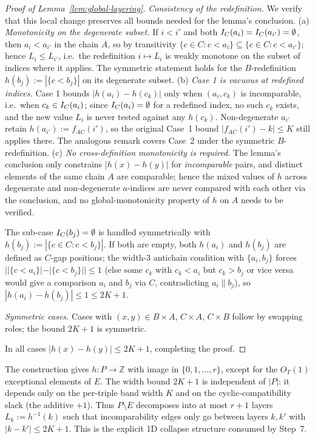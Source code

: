 \begin{proof}[Proof of Lemma~\ref{lem:global-layering}]
\emph{Consistency of the redefinition.} We verify that this local change preserves
all bounds needed for the lemma's conclusion.
(a) \emph{Monotonicity on the degenerate subset.} If $i < i'$ and both
$I_C(a_i) = I_C(a_{i'}) = \emptyset$, then $a_i < a_{i'}$ in the chain $A$, so
by transitivity $\{c \in C : c < a_i\} \subseteq \{c \in C : c < a_{i'}\}$;
hence $L_i \le L_{i'}$, i.e.\ the redefinition $i \mapsto L_i$ is weakly monotone
on the subset of indices where it applies. The symmetric statement holds for
the $B$-redefinition $h(b_j) := |\{c < b_j\}|$ on its degenerate subset.
(b) \emph{Case 1 is vacuous at redefined indices.} Case 1 bounds
$|h(a_i) - h(c_k)|$ only when $(a_i, c_k)$ is incomparable, i.e.\ when
$c_k \in I_C(a_i)$; since $I_C(a_i) = \emptyset$ for a redefined index, no
such $c_k$ exists, and the new value $L_i$ is never tested against any
$h(c_k)$. Non-degenerate $a_{i'}$ retain $h(a_{i'}) := f_{AC}(i')$, so the
original Case~1 bound $|f_{AC}(i') - k| \le K$ still applies there. The
analogous remark covers Case~2 under the symmetric $B$-redefinition.
(c) \emph{No cross-definition monotonicity is required.} The lemma's
conclusion only constrains $|h(x) - h(y)|$ for \emph{incomparable} pairs, and
distinct elements of the same chain $A$ are comparable; hence the mixed values
of $h$ across degenerate and non-degenerate $a$-indices are never compared
with each other via the conclusion, and no global-monotonicity property of
$h$ on $A$ needs to be verified.

The sub-case $I_C(b_j) = \emptyset$ is handled symmetrically with
$h(b_j) := |\{c \in C : c < b_j\}|$. If both are empty, both $h(a_i)$ and
$h(b_j)$ are defined as $C$-gap positions; the width-$3$ antichain condition
with $\{a_i, b_j\}$ forces $| |\{c < a_i\}| - |\{c < b_j\}| | \le 1$ (else
some $c_k$ with $c_{k} < a_i$ but $c_k > b_j$ or vice versa would give a
comparison $a_i$ and $b_j$ via $C$, contradicting $a_i \parallel b_j$), so
$|h(a_i) - h(b_j)| \le 1 \le 2K + 1$.

\smallskip
\noindent\emph{Symmetric cases.} Cases with $(x,y) \in B \times A$,
$C \times A$, $C \times B$ follow by swapping roles; the bound $2K+1$ is
symmetric.

\smallskip
In all cases $|h(x) - h(y)| \le 2K + 1$, completing the proof.
\end{proof}

\begin{remark}
The construction gives $h : P \to \mathbb{Z}$ with image in $\{0, 1, \ldots, r\}$,
except for the $O_T(1)$ exceptional elements of $E$. The width bound
$2K + 1$ is independent of $|P|$: it depends only on the per-triple band
width $K$ and on the cyclic-compatibility slack (the additive $+1$).
Thus $P \setminus E$ decomposes into at most $r + 1$ layers
$L_k := h^{-1}(k)$ such that incomparability edges only go between layers
$k, k'$ with $|k - k'| \le 2K + 1$. This is the explicit 1D collapse
structure consumed by Step~7.
\end{remark}

